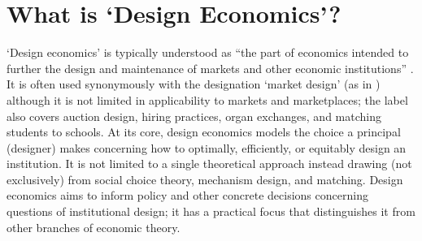 






\section{What is `Design Economics'?}\label{fable_sec_design}

`Design economics' is typically understood as ``the part of economics intended to further the design and maintenance of markets and other economic institutions'' \autocite[p1341]{roth2002}. It is often used synonymously with the designation `market design' (as in \cite{roth2018}) although it is not limited in applicability to markets and marketplaces; the label also covers auction design, hiring practices, organ exchanges, and matching students to schools. At its core, design economics models the choice a principal (designer) makes concerning how to optimally, efficiently, or equitably design an institution. It is not limited to a single theoretical approach instead drawing (not exclusively) from social choice theory, mechanism design, and matching. Design economics aims to inform policy and other concrete decisions concerning questions of institutional design; it has a practical focus that distinguishes it from other branches of economic theory. 


